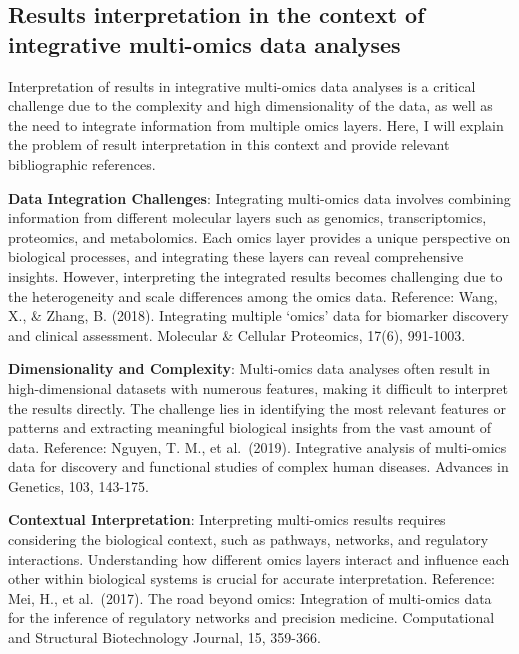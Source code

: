 \documentclass[a4paper, nobind]{templates/ociamthesis}
\begin{document}
\hypertarget{results-interpretation-in-the-context-of-integrative-multi-omics-data-analyses}{%
\subsection{Results interpretation in the context of integrative multi-omics data analyses}\label{results-interpretation-in-the-context-of-integrative-multi-omics-data-analyses}}

Interpretation of results in integrative multi-omics data analyses is a critical challenge due to the complexity and high dimensionality of the data, as well as the need to integrate information from multiple omics layers. Here, I will explain the problem of result interpretation in this context and provide relevant bibliographic references.

\textbf{Data Integration Challenges}: Integrating multi-omics data involves combining information from different molecular layers such as genomics, transcriptomics, proteomics, and metabolomics. Each omics layer provides a unique perspective on biological processes, and integrating these layers can reveal comprehensive insights. However, interpreting the integrated results becomes challenging due to the heterogeneity and scale differences among the omics data. Reference: Wang, X., \& Zhang, B. (2018). Integrating multiple `omics' data for biomarker discovery and clinical assessment. Molecular \& Cellular Proteomics, 17(6), 991-1003.

\textbf{Dimensionality and Complexity}: Multi-omics data analyses often result in high-dimensional datasets with numerous features, making it difficult to interpret the results directly. The challenge lies in identifying the most relevant features or patterns and extracting meaningful biological insights from the vast amount of data. Reference: Nguyen, T. M., et al.~(2019). Integrative analysis of multi-omics data for discovery and functional studies of complex human diseases. Advances in Genetics, 103, 143-175.

\textbf{Contextual Interpretation}: Interpreting multi-omics results requires considering the biological context, such as pathways, networks, and regulatory interactions. Understanding how different omics layers interact and influence each other within biological systems is crucial for accurate interpretation. Reference: Mei, H., et al.~(2017). The road beyond omics: Integration of multi-omics data for the inference of regulatory networks and precision medicine. Computational and Structural Biotechnology Journal, 15, 359-366.
\end{document}
